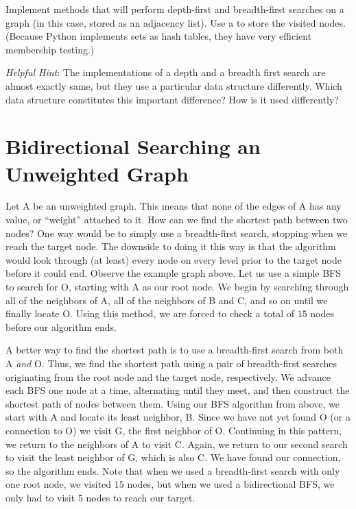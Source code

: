 \begin{problem}
Implement methods that will perform depth-first and breadth-first searches on a graph (in this case, stored as an adjacency list).
Use a  to store the visited nodes. (Because Python implements sets as hash tables, they have very efficient membership testing.)

\emph{Helpful Hint}: The implementations of a depth and a breadth first search
are almost exactly same, but they use a particular data structure differently. 
Which data structure constitutes this important difference? How is it used differently?
\end{problem}

\section*{Bidirectional Searching an Unweighted Graph}

Let A be an unweighted graph. This means that none of the edges of A has any value, or ``weight'' attached to it. How can we find the shortest path between two nodes?
One way would be to simply use a breadth-first search, stopping when we reach the target node. The downside to doing it this way is that the algorithm would look through (at least)
every node on every level prior to the target node before it could end. Observe the example graph above. Let us use a simple BFS to search for O, starting with A as our root node.
We begin by searching through all of the neighbors of A, all of the neighbors of B and C, and so on until we finally locate O. Using this method, we are forced to check
a total of $15$ nodes before our algorithm ends.

A better way to find the shortest path is to use a breadth-first search from 
both A \emph{and} O. Thus, we find the shortest path using a pair of breadth-first searches originating from the root node and the target node, respectively.
We advance each BFS one node at a time, alternating until they meet, and then construct the shortest path of nodes between them.
 Using our BFS algorithm from above, we start with A and locate its
least neighbor, B. Since we have not yet found O (or a connection to O) we visit G, the first neighbor of O. Continuing in this pattern, we return to the neighbors
of A to visit C. Again, we return to our second search to visit the least neighbor of G, which is also C. We have found our connection, so the algorithm ends. Note that when we used a breadth-first
search with only one root node, we visited $15$ nodes, but when we used a bidirectional BFS, we only had to visit $5$ nodes to reach our target.

